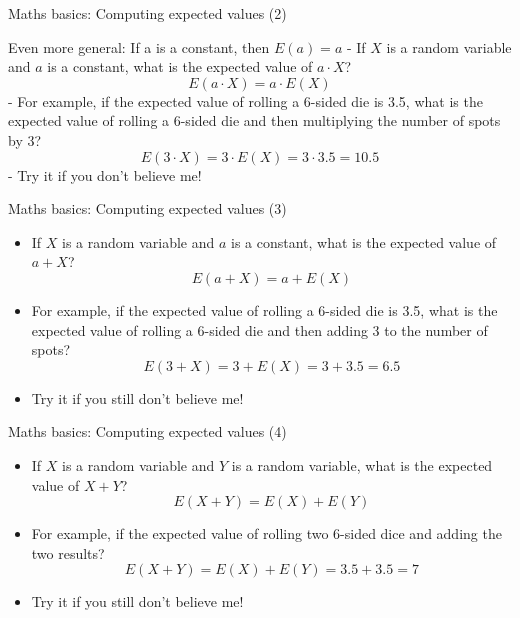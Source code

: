 \begin{frame}{Maths basics: Computing expected values (2)}

Even more general: If a is a constant, then \(E(a) = a\) - If \(X\) is a
random variable and \(a\) is a constant, what is the expected value of
\(a \cdot X\)? \[E(a\cdot X) = a \cdot E(X)\] - For example, if the
expected value of rolling a 6-sided die is 3.5, what is the expected
value of rolling a 6-sided die and then multiplying the number of spots
by 3? \[ E(3\cdot X) = 3\cdot E(X) = 3\cdot 3.5 = 10.5\] - Try it if you
don't believe me!

\end{frame}

\begin{frame}{Maths basics: Computing expected values (3)}

\begin{itemize}
\itemsep1pt\parskip0pt
\item
  If \(X\) is a random variable and \(a\) is a constant, what is the
  expected value of \(a + X\)? \[E(a + X) = a + E(X)\]
\item
  For example, if the expected value of rolling a 6-sided die is 3.5,
  what is the expected value of rolling a 6-sided die and then adding 3
  to the number of spots? \[ E(3 + X) = 3 + E(X) = 3 + 3.5 = 6.5\]
\item
  Try it if you still don't believe me!
\end{itemize}

\end{frame}

\begin{frame}{Maths basics: Computing expected values (4)}

\begin{itemize}
\itemsep1pt\parskip0pt
\item
  If \(X\) is a random variable and \(Y\) is a random variable, what is
  the expected value of \(X + Y\)? \[E(X + Y) = E(X) + E(Y)\]
\item
  For example, if the expected value of rolling two 6-sided dice and
  adding the two results? \[ E(X + Y) = E(X) + E(Y)= 3.5 + 3.5 = 7\]
\item
  Try it if you still don't believe me!
\end{itemize}

\end{frame}

